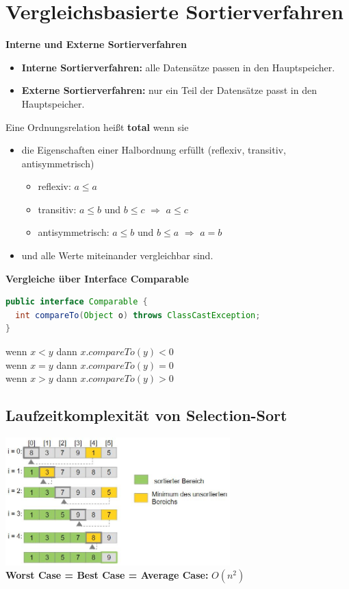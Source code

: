 \documentclass{scrreprt}
\begin{document}
\section{Vergleichsbasierte Sortierverfahren}
\textbf{Interne und Externe Sortierverfahren}
\begin{itemize}
  \item \textbf{Interne Sortierverfahren:} alle Datensätze passen in den Hauptspeicher.
  \item \textbf{Externe Sortierverfahren:} nur ein Teil der Datensätze passt in den Hauptspeicher.
\end{itemize}
Eine Ordnungsrelation heißt \textbf{total} wenn sie
\begin{itemize}
  \item die Eigenschaften einer Halbordnung erfüllt (reflexiv, transitiv, antisymmetrisch)
  \begin{itemize}
    \item reflexiv: $a \leq a$
    \item transitiv: $a \leq b$ und $b \leq c$ $\Rightarrow$ $a \leq c$
    \item antisymmetrisch: $a \leq b$ und $b \leq a$ $\Rightarrow$ $a = b$
  \end{itemize}
  \item und alle Werte miteinander vergleichbar sind.
\end{itemize}
\textbf{Vergleiche über Interface Comparable}
\begin{lstlisting}[language=Java]
public interface Comparable {
  int compareTo(Object o) throws ClassCastException;
}
\end{lstlisting}
wenn $x < y$ dann $x.compareTo(y) < 0$
\\wenn $x = y$ dann $x.compareTo(y) = 0$
\\wenn $x > y$ dann $x.compareTo(y) > 0$
\subsection{Laufzeitkomplexität von Selection-Sort}
\includegraphics[width=0.65\textwidth]{graphics/Selectionsort}
\\\textbf{Worst Case = Best Case = Average Case:} $O(n^2)$
\end{document}
